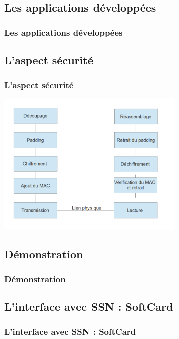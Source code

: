 \documentclass{beamer}
\begin{document}
\subsection{Les applications développées}
\begin{frame}
    \frametitle{Les applications développées}
    \begin{block}{}
    \end{block}
\end{frame}

\subsection{L'aspect sécurité}
\begin{frame}
    \frametitle{L'aspect sécurité}
    \includegraphics[width=9cm]{stack}
\end{frame}

\subsection{Démonstration}
\begin{frame}
    \frametitle{Démonstration}
    \begin{block}{}
    \end{block}
\end{frame}

\subsection{L'interface avec SSN : SoftCard}
\begin{frame}
    \frametitle{L'interface avec SSN : SoftCard}
    \begin{block}{}
    \end{block}
\end{frame}
\end{document}
